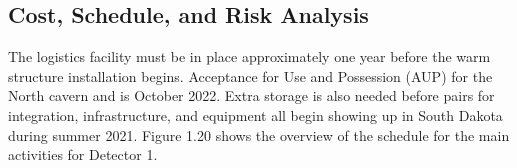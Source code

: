 

\subsection{Cost, Schedule, and Risk Analysis}
\label{sec:fdsp-tc-log-cost}



The logistics facility must be in place approximately one year before the warm structure installation begins.  Acceptance for Use and Possession (AUP) for the North cavern and  is October 2022.  Extra storage is also needed before  pairs for integration,  infrastructure, and equipment all begin showing up in  South Dakota during summer 2021. Figure 1.20 shows the overview of the schedule for the main activities for Detector 1.

